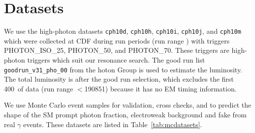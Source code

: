 \documentclass[11pt]{article}
\begin{document}
\section{Datasets}
We use the high-\pt photon datasets \texttt{cph10d}, \texttt{cph10h}, \texttt{cph10i}, \texttt{cph10j}, and \texttt{cph10m} which were collected at CDF during run periods  \runperiods (run range \runrange) with triggers \mbox{PHOTON\_ISO\_25}, \mbox{PHOTON\_50}, and \mbox{PHOTON\_70}. These triggers are high-\pt photon triggers which suit our resonance search.  The good run list \texttt{goodrun\_v31\_pho\_00} from the hoton Group is used to estimate the luminosity.  The total luminosity is  \datalumAfterGoodRun after the good run selection, which excludes the first 400~\pbi of data (run range $<$190851) because it has no EM timing information.

We use Monte Carlo event samples for validation, cross checks, and to predict the shape of the SM prompt photon fraction, electroweak background and fake \met from real $\gamma$ events. These datasets are listed in Table~\ref{tab:mcdatasets}.
\end{document}
